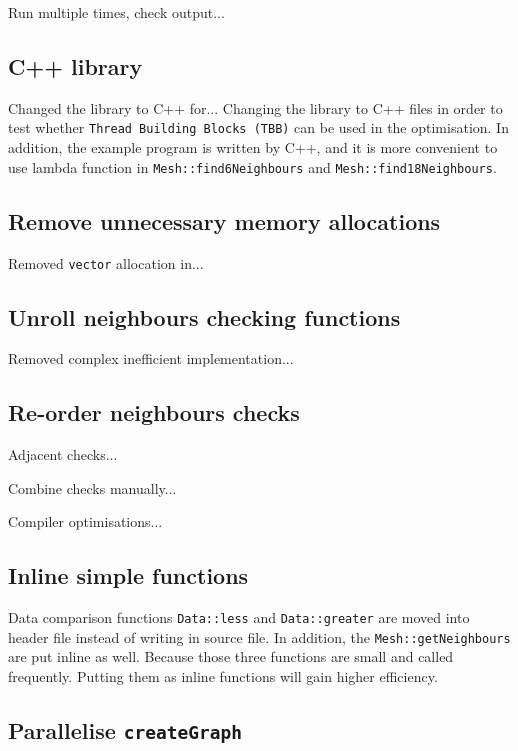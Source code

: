 \documentclass[conference]{IEEEtran}
\begin{document}
Run multiple times, check output...


\subsection{C++ library}

Changed the library to C++ for...
Changing the library to C++ files in order to test whether \texttt{Thread Building Blocks (TBB)} can be used in the optimisation. In addition, the example program is written by C++, and it is more convenient to use lambda function in \texttt{Mesh::find6Neighbours} and \texttt{Mesh::find18Neighbours}. 

\subsection{Remove unnecessary memory allocations}

Removed \texttt{vector} allocation in...

\subsection{Unroll neighbours checking functions}

Removed complex inefficient implementation...

\subsection{Re-order neighbours checks}

Adjacent checks...

Combine checks manually...

Compiler optimisations...

\subsection{Inline simple functions}

Data comparison functions \texttt{Data::less} and \texttt{Data::greater} are moved into header file instead of writing in source file. In addition, the \texttt{Mesh::getNeighbours} are put inline as well. Because those three functions are small and called frequently. Putting them as inline functions will gain higher efficiency. 

\subsection{Parallelise \texttt{createGraph}}
\end{document}
